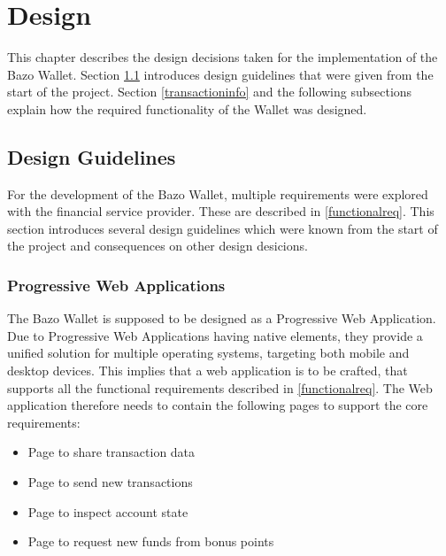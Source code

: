 \chapter{Design}\label{design}
This chapter describes the design decisions taken for the implementation of the Bazo Wallet. Section \ref{designguide} introduces design guidelines that were given from the start of the project. Section \ref{transactioninfo} and the following subsections explain how the required functionality of the Wallet was designed.
\section{Design Guidelines}\label{designguide}
For the development of the Bazo Wallet, multiple requirements were explored with the financial service provider. These are described in \ref{functionalreq}. This section introduces several design guidelines which were known from the start of the project and consequences on other design desicions.
\subsection{Progressive Web Applications}
The Bazo Wallet is supposed to be designed as a Progressive Web Application. Due to Progressive Web Applications having native elements, they provide a unified solution for multiple operating systems, targeting both mobile and desktop devices. This implies that a web application is to be crafted, that supports all the functional requirements described in \ref{functionalreq}. The Web application therefore needs to contain the following pages to support the core requirements:
\begin{itemize}
\item Page to share transaction data
\item Page to send new transactions
\item Page to inspect account state
\item Page to request new funds from bonus points
\end{itemize}

